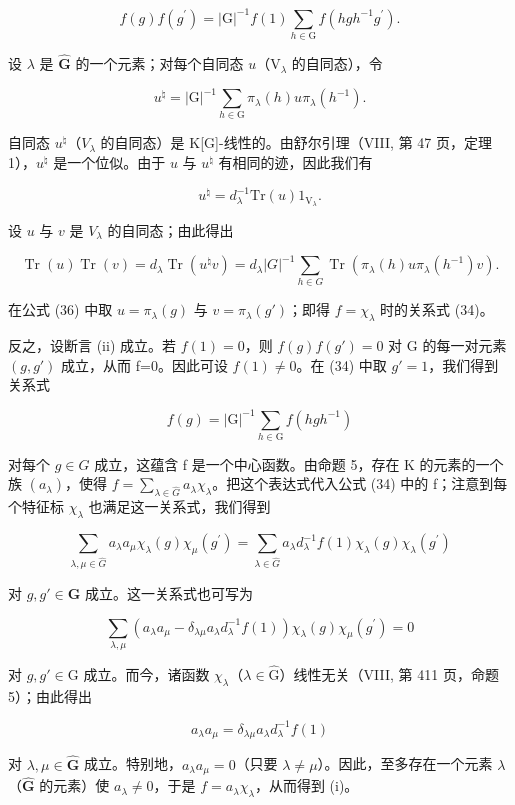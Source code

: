 \[
f (g) f (g ^ {\prime}) = | \mathrm{G} | ^ {- 1} f (1) \sum_ {h \in \mathrm{G}} f (h g h ^ {- 1} g ^ {\prime}).\tag{34}
\]

设 \(\lambda\) 是 \(\widehat{\mathbf{G}}\) 的一个元素；对每个自同态 \(u\)（\(\mathrm{V}_{\lambda}\) 的自同态），令

\[
u ^ {\natural} = | \mathrm{G} | ^ {- 1} \sum_ {h \in \mathrm{G}} \pi_ {\lambda} (h) u \pi_ {\lambda} (h ^ {- 1}).\tag{35}
\]

自同态 \(u^{\natural}\)（\(V_{\lambda}\) 的自同态）是 K{[}G{]}-线性的。由舒尔引理（VIII, 第 47 页，定理 1），\(u^{\natural}\) 是一个位似。由于 \(u\) 与 \(u^{\natural}\) 有相同的迹，因此我们有

\[
u ^ {\natural} = d _ {\lambda} ^ {- 1} \mathrm{Tr} (u) 1 _ {\mathrm{V} _ {\lambda}}.
\]

设 \(u\) 与 \(v\) 是 \(V_{\lambda}\) 的自同态；由此得出

\[
\operatorname{Tr} (u) \operatorname{Tr} (v) = d _ {\lambda} \operatorname{Tr} (u ^ {\natural} v) = d _ {\lambda} | G | ^ {- 1} \sum_ {h \in G} \operatorname{Tr} (\pi_ {\lambda} (h) u \pi_ {\lambda} (h ^ {- 1}) v).\tag{36}
\]

在公式 (36) 中取 \(u = \pi_{\lambda}(g)\) 与 \(v = \pi_{\lambda}(g')\)；即得 \(f = \chi_{\lambda}\) 时的关系式 (34)。

反之，设断言 (ii) 成立。若 \(f(1)=0\)，则 \(f(g)f(g')=0\) 对 G 的每一对元素 \((g,g')\) 成立，从而 f=0。因此可设 \(f(1)\neq0\)。在 (34) 中取 \(g'=1\)，我们得到关系式

\[
f (g) = | \mathrm{G} | ^ {- 1} \sum_ {h \in \mathrm{G}} f (h g h ^ {- 1})
\]

对每个 \(g \in G\) 成立，这蕴含 f 是一个中心函数。由命题 5，存在 K 的元素的一个族 \((a_{\lambda})\)，使得 \(f = \sum_{\lambda \in \widehat{G}} a_{\lambda} \chi_{\lambda}\)。把这个表达式代入公式 (34) 中的 f；注意到每个特征标 \(\chi_{\lambda}\) 也满足这一关系式，我们得到

\[
\sum_ {\lambda , \mu \in \widehat {G}} a _ {\lambda}   a _ {\mu}   \chi_ {\lambda} (g)   \chi_ {\mu} (g ^ {\prime}) = \sum_ {\lambda \in \widehat {G}} a _ {\lambda}   d _ {\lambda} ^ {- 1}   f (1)   \chi_ {\lambda} (g)   \chi_ {\lambda} (g ^ {\prime})\tag{37}
\]

对 \(g, g' \in \mathbf{G}\) 成立。这一关系式也可写为

\[
\sum_ {\lambda , \mu} (a _ {\lambda} a _ {\mu} - \delta_ {\lambda \mu} a _ {\lambda} d _ {\lambda} ^ {- 1} f (1)) \chi_ {\lambda} (g) \chi_ {\mu} (g ^ {\prime}) = 0\tag{38}
\]

对 \(g, g' \in \mathrm{G}\) 成立。而今，诸函数 \(\chi_{\lambda}\)（\(\lambda \in \widehat{\mathrm{G}}\)）线性无关（VIII, 第 411 页，命题 5）；由此得出

\[
a _ {\lambda} a _ {\mu} = \delta_ {\lambda \mu} a _ {\lambda} d _ {\lambda} ^ {- 1} f (1)
\]

对 \(\lambda, \mu \in \widehat{\mathbf{G}}\) 成立。特别地，\(a_{\lambda}a_{\mu} = 0\)（只要 \(\lambda \neq \mu\)）。因此，至多存在一个元素 \(\lambda\)（\(\widehat{\mathbf{G}}\) 的元素）使 \(a_{\lambda} \neq 0\)，于是 \(f = a_{\lambda}\chi_{\lambda}\)，从而得到 (i)。


